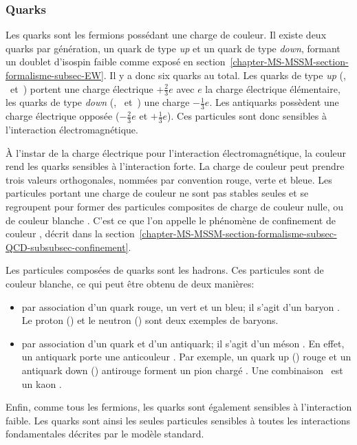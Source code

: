 \subsubsection{Quarks}\label{chapter-MS-MSSM-section-SM_ptcs-subsec-fermions-subsubsec-quarks}
Les quarks sont les fermions possédant une charge de couleur.
Il existe deux quarks par génération, un quark de type \emph{up} et un quark de type \emph{down}, formant un doublet d'isospin faible comme exposé en section~\ref{chapter-MS-MSSM-section-formalisme-subsec-EW}.
Il y a donc six quarks au total. Les quarks de type \emph{up} (\quarku, \quarkc\ et~\quarkt) portent une charge électrique $+\frac{2}{3}e$ avec $e$ la charge électrique élémentaire, les quarks de type \emph{down} (\quarkd, \quarks\ et~\quarkb) une charge $-\frac{1}{3}e$. Les antiquarks possèdent une charge électrique opposée ($-\frac{2}{3}e$ et $+\frac{1}{3}e$). Ces particules sont donc sensibles à l'interaction électromagnétique.
\par À l'instar de la charge électrique pour l'interaction électromagnétique, la \og couleur \fg rend les quarks sensibles à l'interaction forte. La charge de couleur peut prendre trois valeurs orthogonales, nommées par convention rouge, verte et bleue. Les particules portant une charge de couleur ne sont pas stables seules et se regroupent pour former des particules composites de charge de couleur nulle, ou de couleur \og blanche \fg. C'est ce que l'on appelle le phénomène de \og confinement de couleur \fg, décrit dans la section~\ref{chapter-MS-MSSM-section-formalisme-subsec-QCD-subsubsec-confinement}.
\par Les particules composées de quarks sont les hadrons. Ces particules sont de couleur blanche, ce qui peut être obtenu de deux manières:
\begin{itemize}
\item par association d'un quark rouge, un vert et un bleu; il s'agit d'un \og baryon \fg. Le proton (\quarku\quarku\quarkd) et le neutron (\quarku\quarkd\quarkd) sont deux exemples de baryons.
\item par association d'un quark et d'un antiquark; il s'agit d'un \og méson \fg. En effet, un antiquark porte une \og anticouleur \fg. Par exemple, un quark up (\quarku) rouge et un antiquark down (\antiquarkd) \og antirouge \fg{} forment un pion chargé \pionplus. Une combinaison \quarku\antiquarks\ est un kaon \Kaonplus.
\end{itemize}
\par Enfin, comme tous les fermions, les quarks sont également sensibles à l'interaction faible. Les quarks sont ainsi les seules particules sensibles à toutes les interactions fondamentales décrites par le modèle standard.

